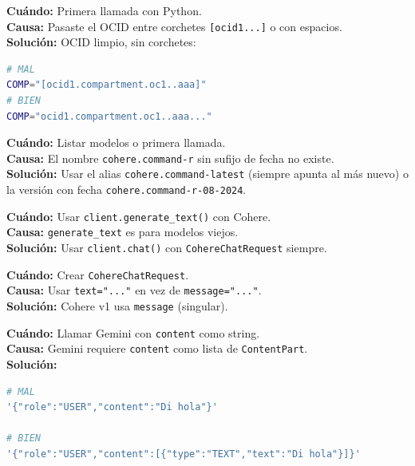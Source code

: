 \documentclass[11pt,a4paper,oneside]{article}
\begin{document}
\begin{tcolorbox}[colback=errred!5!white,colframe=errred,breakable,title={Error 2: ``Compartment ID is not valid''}]
\textbf{Cuándo:} Primera llamada con Python. \\
\textbf{Causa:} Pasaste el OCID entre corchetes \texttt{[ocid1...]} o con espacios. \\
\textbf{Solución:} OCID limpio, sin corchetes:
\begin{lstlisting}[language=bash]
# MAL
COMP="[ocid1.compartment.oc1..aaa]"
# BIEN
COMP="ocid1.compartment.oc1..aaa..."
\end{lstlisting}
\end{tcolorbox}

\begin{tcolorbox}[colback=errred!5!white,colframe=errred,breakable,title={Error 3: ``Entity with key cohere.command-r not found''}]
\textbf{Cuándo:} Listar modelos o primera llamada. \\
\textbf{Causa:} El nombre \texttt{cohere.command-r} sin sufijo de fecha no existe. \\
\textbf{Solución:} Usar el alias \texttt{cohere.command-latest} (siempre apunta al más nuevo) o la versión con fecha \texttt{cohere.command-r-08-2024}.
\end{tcolorbox}

\begin{tcolorbox}[colback=errred!5!white,colframe=errred,breakable,title={Error 4: ``cohere.command-latest does not support TextGeneration''}]
\textbf{Cuándo:} Usar \texttt{client.generate\_text()} con Cohere. \\
\textbf{Causa:} \texttt{generate\_text} es para modelos viejos. \\
\textbf{Solución:} Usar \texttt{client.chat()} con \texttt{CohereChatRequest} siempre.
\end{tcolorbox}

\begin{tcolorbox}[colback=errred!5!white,colframe=errred,breakable,title={Error 5: ``Unrecognized keyword arguments: text''}]
\textbf{Cuándo:} Crear \texttt{CohereChatRequest}. \\
\textbf{Causa:} Usar \texttt{text="..."} en vez de \texttt{message="..."}. \\
\textbf{Solución:} Cohere v1 usa \texttt{message} (singular).
\end{tcolorbox}

\begin{tcolorbox}[colback=errred!5!white,colframe=errred,breakable,title={Error 6: ``Please pass in correct format of request'' (Gemini CLI)}]
\textbf{Cuándo:} Llamar Gemini con \texttt{content} como string. \\
\textbf{Causa:} Gemini requiere \texttt{content} como lista de \texttt{ContentPart}. \\
\textbf{Solución:}
\begin{lstlisting}[language=bash]
# MAL
'{"role":"USER","content":"Di hola"}'

# BIEN
'{"role":"USER","content":[{"type":"TEXT","text":"Di hola"}]}'
\end{lstlisting}
\end{tcolorbox}
\end{document}

